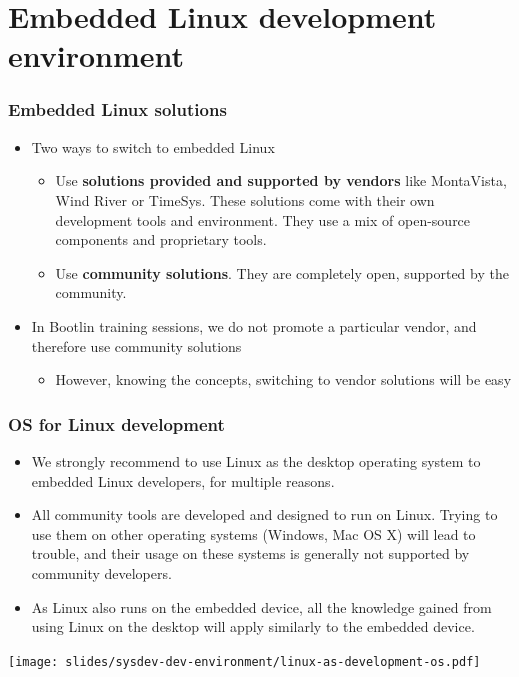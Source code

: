 \section{Embedded Linux development environment}

\begin{frame}
  \frametitle{Embedded Linux solutions}
  \begin{itemize}
  \item Two ways to switch to embedded Linux
    \begin{itemize}
    \item Use {\bf solutions provided and supported by vendors} like
      MontaVista, Wind River or TimeSys. These solutions come with
      their own development tools and environment. They use a mix of
      open-source components and proprietary tools.
    \item Use {\bf community solutions}. They are completely open,
      supported by the community.
    \end{itemize}
  \item In Bootlin training sessions, we do not promote a particular
    vendor, and therefore use community solutions
    \begin{itemize}
    \item However, knowing the concepts, switching to vendor solutions will be easy
    \end{itemize}
  \end{itemize}
\end{frame}

\begin{frame}
  \frametitle{OS for Linux development}
  \begin{itemize}
  \item We strongly recommend to use Linux as the desktop operating
    system to embedded Linux developers, for multiple reasons.
  \item All community tools are developed and designed to run on
    Linux. Trying to use them on other operating systems (Windows, Mac
    OS X) will lead to trouble, and their usage on these systems is
    generally not supported by community developers.
  \item As Linux also runs on the embedded device, all the knowledge
    gained from using Linux on the desktop will apply similarly to the
    embedded device.
  \end{itemize}
  \begin{center}
    \texttt{[image: slides/sysdev-dev-environment/linux-as-development-os.pdf]}
  \end{center}
\end{frame}

